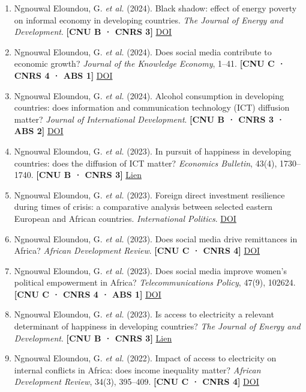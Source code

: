 \documentclass[
  french,
  10pt,
  letterpaper,
  DIV=11,
  numbers=noendperiod]{scrartcl}
\newcommand{\rank}[1]{{\small\color{accent}\textbf{[#1]}}}
\begin{document}
\begin{enumerate}[leftmargin=1.6em, itemsep=3pt]
\item Ngnouwal Eloundou, G. \textit{et al.} (2024). Black shadow: effect of energy poverty on informal economy in developing countries. \textit{The Journal of Energy and Development}. \rank{CNU B · CNRS 3} \href{https://doi.org/10.56476/jed.v49i1.21}{DOI}

\item Ngnouwal Eloundou, G. \textit{et al.} (2024). Does social media contribute to economic growth? \textit{Journal of the Knowledge Economy}, 1–41. \rank{CNU C · CNRS 4 · ABS 1} \href{https://doi.org/10.1007/s13132-023-01419-1}{DOI}

\item Ngnouwal Eloundou, G. \textit{et al.} (2024). Alcohol consumption in developing countries: does information and communication technology (ICT) diffusion matter? \textit{Journal of International Development}. \rank{CNU B · CNRS 3 · ABS 2} \href{https://doi.org/10.1002/jid.3858}{DOI}

\item Ngnouwal Eloundou, G. \textit{et al.} (2023). In pursuit of happiness in developing countries: does the diffusion of ICT matter? \textit{Economics Bulletin}, 43(4), 1730–1740. \rank{CNU B · CNRS 3} \href{https://econpapers.repec.org/article/eblecbull/eb22-00799.htm}{Lien}

\item Ngnouwal Eloundou, G. \textit{et al.} (2023). Foreign direct investment resilience during times of crisis: a comparative analysis between selected eastern European and African countries. \textit{International Politics}. \href{https://doi.org/10.18485/iipe_mp.2023.74.1189.4}{DOI}

\item Ngnouwal Eloundou, G. \textit{et al.} (2023). Does social media drive remittances in Africa? \textit{African Development Review}. \rank{CNU C · CNRS 4} \href{https://doi.org/10.1111/1467-8268.12717}{DOI}

\item Ngnouwal Eloundou, G. \textit{et al.} (2023). Does social media improve women's political empowerment in Africa? \textit{Telecommunications Policy}, 47(9), 102624. \rank{CNU C · CNRS 4 · ABS 1} \href{https://doi.org/10.1016/j.telpol.2023.102624}{DOI}

\item Ngnouwal Eloundou, G. \textit{et al.} (2023). Is access to electricity a relevant determinant of happiness in developing countries? \textit{The Journal of Energy and Development}. \rank{CNU B · CNRS 3} \href{https://www.jstor.org/stable/27284853}{Lien}

\item Ngnouwal Eloundou, G. \textit{et al.} (2022). Impact of access to electricity on internal conflicts in Africa: does income inequality matter? \textit{African Development Review}, 34(3), 395–409. \rank{CNU C · CNRS 4} \href{https://doi.org/10.1111/1467-8268.12664}{DOI}

\end{enumerate}
\end{document}
